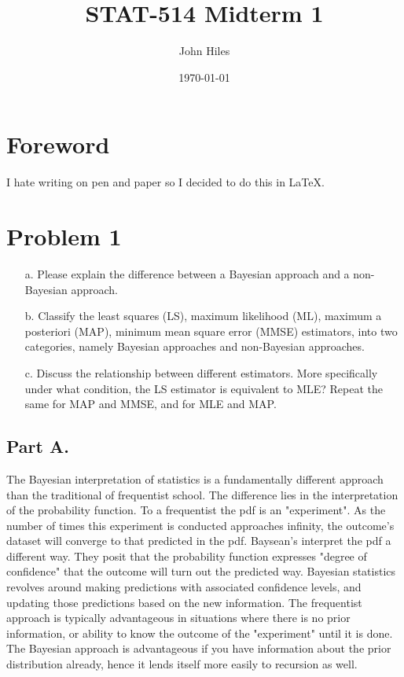 \documentclass{article}
\title{STAT-514 Midterm 1}
\author{John Hiles}
\date\today
\begin{document}
\maketitle %

\section*{Foreword}
I hate writing on pen and paper so I decided to do this in LaTeX.

\section*{Problem 1}
\begin{enumerate}
\item[a.] Please explain the difference between a Bayesian approach and a non-Bayesian approach.
\item[b.] Classify the least squares (LS), maximum likelihood (ML), maximum a posteriori (MAP),
minimum mean square error (MMSE) estimators, into two categories, namely Bayesian approaches
and non-Bayesian approaches.
\item[c.] Discuss the relationship between different estimators. More specifically under what condition, the LS estimator is equivalent to MLE? Repeat the same for MAP and MMSE, and for MLE
and MAP.
\end{enumerate}
\subsection*{Part A.}
The Bayesian interpretation of statistics is a fundamentally different approach than the traditional of frequentist school. The difference lies in the interpretation of the probability function. To a frequentist the pdf is an "experiment". As the number of times this experiment is conducted approaches infinity, the outcome's dataset will converge to that predicted in the pdf. Baysean's interpret the pdf a different way. They posit that the probability function expresses "degree of confidence" that the outcome will turn out the predicted way. Bayesian statistics revolves around making predictions with associated confidence levels, and updating those predictions based on the new information. The frequentist approach is typically advantageous in situations where there is no prior information, or ability to know the outcome of the "experiment" until it is done. The Bayesian approach is advantageous if you have information about the prior distribution already, hence it lends itself more easily to recursion as well.
\end{document}
